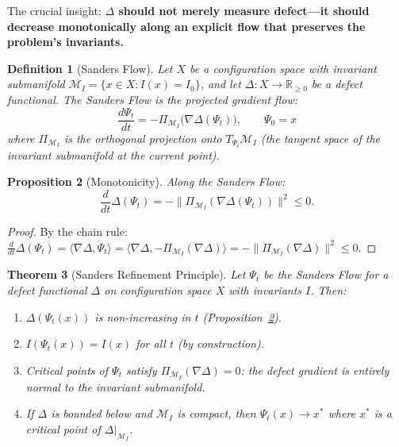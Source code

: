 \documentclass[12pt, openany]{book}
\newtheorem{theorem}{Theorem}[chapter]
\newtheorem{proposition}[theorem]{Proposition}
\newtheorem{definition}[theorem]{Definition}
\theoremstyle{remark}
\begin{document}
\noindent
The crucial insight: \textbf{$\Delta$ should not merely measure defect---it should
decrease monotonically along an explicit flow that preserves the problem's invariants.}

\begin{definition}[Sanders Flow]\label{def:sanders-flow}
Let $X$ be a configuration space with invariant submanifold
$\mathcal{M}_I = \{x \in X : I(x) = I_0\}$, and let $\Delta : X \to \mathbb{R}_{\geq 0}$
be a defect functional. The \emph{Sanders Flow} is the projected gradient flow:
\[
  \boxed{\frac{d\Psi_t}{dt} = -\Pi_{\mathcal{M}_I}\!\bigl(\nabla \Delta(\Psi_t)\bigr), \qquad \Psi_0 = x}
\]
where $\Pi_{\mathcal{M}_I}$ is the orthogonal projection onto $T_{\Psi_t}\mathcal{M}_I$
(the tangent space of the invariant submanifold at the current point).
\end{definition}

\begin{proposition}[Monotonicity]\label{prop:sanders-mono}
Along the Sanders Flow:
\[
  \frac{d}{dt}\Delta(\Psi_t) = -\|\Pi_{\mathcal{M}_I}(\nabla\Delta(\Psi_t))\|^2 \leq 0.
\]
\end{proposition}

\begin{proof}
By the chain rule:
$\frac{d}{dt}\Delta(\Psi_t) = \langle \nabla\Delta, \dot{\Psi}_t \rangle
= \langle \nabla\Delta, -\Pi_{\mathcal{M}_I}(\nabla\Delta) \rangle
= -\|\Pi_{\mathcal{M}_I}(\nabla\Delta)\|^2 \leq 0$.
\end{proof}

\begin{theorem}[Sanders Refinement Principle]\label{thm:sanders-refine}
Let $\Psi_t$ be the Sanders Flow for a defect functional $\Delta$ on configuration
space $X$ with invariants $I$. Then:
\begin{enumerate}
  \item $\Delta(\Psi_t(x))$ is non-increasing in $t$ (Proposition~\ref{prop:sanders-mono}).
  \item $I(\Psi_t(x)) = I(x)$ for all $t$ (by construction).
  \item Critical points of $\Psi_t$ satisfy $\Pi_{\mathcal{M}_I}(\nabla\Delta) = 0$:
        the defect gradient is entirely normal to the invariant submanifold.
  \item If $\Delta$ is bounded below and $\mathcal{M}_I$ is compact, then
        $\Psi_t(x) \to x^*$ where $x^*$ is a critical point of $\Delta|_{\mathcal{M}_I}$.
\end{enumerate}
\end{theorem}
\end{document}
